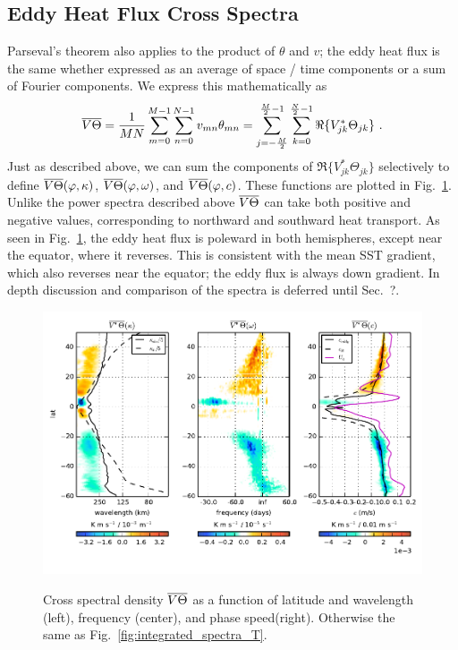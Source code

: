 \documentclass[10pt]{article}
\newcommand{\ol}{\ensuremath{\overline}}
\begin{document}
\subsection{Eddy Heat Flux Cross Spectra}

Parseval's theorem also applies to the product of $\theta$ and $v$; the eddy heat flux is the same whether expressed as an average of space / time components or a sum of Fourier components. We express this mathematically as
\begin{equation}
\ol{V\Theta} = \frac{1}{MN} \sum_{m=0}^{M-1} \sum_{n=0}^{N-1} v_{mn} \theta_{mn} = \sum_{j=-\frac{M}{2}}^{\frac{M}{2}-1} \sum_{k=0}^{\frac{N}{2}-1} \Re \{ V_{jk}^\ast  \Theta_{jk} \} \ .
\end{equation}
Just as described above, we can sum the components of $\Re \{ V_{jk}^\ast  \Theta_{jk} \}$ selectively to define $\ol{V\Theta}(\varphi, \kappa)$, $\ol{V\Theta}(\varphi, \omega)$, and $\ol{V\Theta}(\varphi, c)$. These functions are plotted in  Fig.~\ref{fig:integrated_spectra_VT}. Unlike the power spectra described above $\ol{V\Theta}$ can take both positive and negative values, corresponding to northward and southward heat transport. As seen in Fig.~\ref{fig:integrated_spectra_VT}, the eddy heat flux is poleward in both hemispheres, except near the equator, where it reverses. This is consistent with the mean SST gradient, which also reverses near the equator; the eddy flux is always down gradient. In depth discussion and comparison of the spectra is deferred until Sec.~?.  %

\begin{figure}[t]
  \noindent\includegraphics{../figures/SAT_50degwide/integrated_spectra_VT.pdf}\\
  \caption{Cross spectral density $\ol{V\Theta}$  as a function of latitude and wavelength (left), frequency (center), and phase speed(right). Otherwise the same as Fig.~\ref{fig:integrated_spectra_T}.}
  \label{fig:integrated_spectra_VT}
\end{figure}
\end{document}
